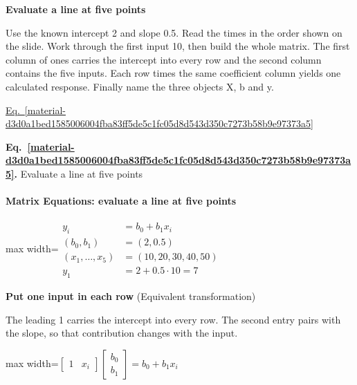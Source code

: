 \documentclass[11pt,a4paper]{article}
\begin{document}
\textbf{Evaluate a line at five points}


Use the known intercept 2 and slope 0.5. Read the times in the order shown on the slide. Work through the first input 10, then build the whole matrix. The first column of ones carries the intercept into every row and the second column contains the five inputs. Each row times the same coefficient column yields one calculated response. Finally name the three objects X, b and y.


\hyperref[material-d3d0a1bed1585006004fba83ff5de5c1fc05d8d543d350c7273b58b9e97373a5]{Eq.~\ref*{material-d3d0a1bed1585006004fba83ff5de5c1fc05d8d543d350c7273b58b9e97373a5}}


\par\medskip
{}
\label{material-d3d0a1bed1585006004fba83ff5de5c1fc05d8d543d350c7273b58b9e97373a5}
\noindent\textbf{Eq.~\ref*{material-d3d0a1bed1585006004fba83ff5de5c1fc05d8d543d350c7273b58b9e97373a5}.} Evaluate a line at five points\par\nopagebreak
\paragraph{Matrix Equations: evaluate a line at five points}
\begin{center}\begin{adjustbox}{max width=\linewidth}$\displaystyle \begin{aligned} y_i&=b_0+b_1x_i\\ (b_0,b_1)&=(2,0.5)\\ (x_1,\ldots,x_5)&=(10,20,30,40,50)\\ y_1&=2+0.5\cdot 10=7\end{aligned}$\end{adjustbox}\end{center}
\noindent\textbf{Put one input in each row} (Equivalent transformation)\par
The leading 1 carries the intercept into every row. The second entry pairs with the slope, so that contribution changes with the input.
\begin{center}\begin{adjustbox}{max width=\linewidth}$\displaystyle \begin{bmatrix}1&x_i\end{bmatrix}\begin{bmatrix}b_0\\ b_1\end{bmatrix}=b_0+b_1x_i$\end{adjustbox}\end{center}
\end{document}
